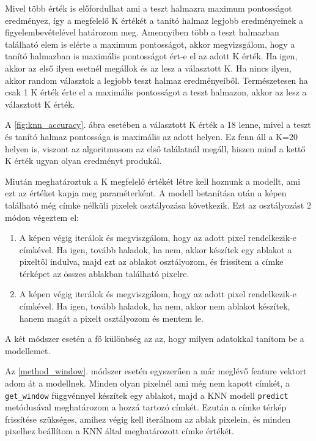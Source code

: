 Mivel több érték is előfordulhat ami a teszt halmazra maximum pontosságot eredményez, így a megfelelő K értékét a tanító halmaz legjobb eredményeinek a figyelembevételével határozom meg. Amennyiben több a teszt halmazban található elem is elérte a maximum pontosságot, akkor megvizsgálom, hogy a tanító halmazban is maximális pontosságot ért-e el az adott K érték. Ha igen, akkor az első ilyen esetnél megállok és az lesz a választott K. Ha nincs ilyen, akkor random választok a legjobb teszt halmaz eredményeiből. Természetesen ha csak 1 K érték érte el a maximális pontosságot a teszt halmazon, akkor az lesz a választott K érték.

A \ref{fig:knn_accuracy}. ábra esetében a választott K érték a 18 lenne, mivel a teszt és tanító halmaz pontossága is maximális az adott helyen. Ez fenn áll a K=20 helyen is, viszont az algoritmusom az első találatnál megáll, hiszen mind a kettő K érték ugyan olyan eredményt produkál.

Miután meghatároztuk a K megfelelő értékét létre kell hoznunk a modellt, ami ezt az értéket kapja meg paraméterként. A modell betanítása után a képen található még címke nélküli pixelek osztályozása következik. Ezt az osztályozást 2 módon végeztem el:
\begin{enumerate}
\item \label{method_window} A képen végig iterálok és megviszgálom, hogy az adott pixel rendelkezik-e címkével. Ha igen, tovább haladok, ha nem, akkor készítek egy ablakot a pixeltől indulva, majd ezt az ablakot osztályozom, és frissítem a címke térképet az összes ablakban található pixelre.
\item \label{method_pixel} A képen végig iterálok és megviszgálom, hogy az adott pixel rendelkezik-e címkével. Ha igen, tovább haladok, ha nem, akkor nem ablakot készítek, hanem magát a pixelt osztályozom és mentem le.
\end{enumerate}

A két módszer esetén a fő különbség az az, hogy milyen adatokkal tanítom be a modellemet.

Az \ref{method_window}. módszer esetén egyszerűen a már meglévő feature vektort adom át a modellnek. Minden olyan pixelnél ami még nem kapott címkét, a \texttt{get\_window} függvénnyel készítek egy ablakot, majd a KNN modell \texttt{predict} metódusával meghatározom a hozzá tartozó címkét. Ezután a címke térkép frissítése szükséges, amihez végig kell iterálnom az ablak pixelein, és minden pixelhez beállítom a KNN által meghatározott címke értékét.

